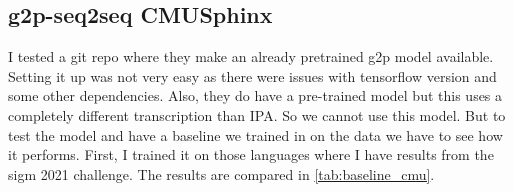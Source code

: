 \subsection{g2p-seq2seq CMUSphinx}
I tested a git repo where they make an already pretrained \ac{g2p} model available. Setting it up was not very easy as there were issues with tensorflow version and some other dependencies. Also, they do have a pre-trained model but this uses a completely different transcription than IPA. So we cannot use this model. But to test the model and have a baseline we trained in on the data we have to see how it performs. First, I trained it on those languages where I have results from the \ac{sigm} 2021 challenge. The results are compared in \ref{tab:baseline_cmu}. 

